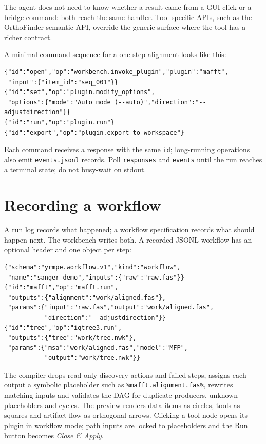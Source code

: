 \documentclass[10pt]{report}
\begin{document}
The agent does not need to know whether a result came from a GUI click or a
bridge command: both reach the same handler. Tool-specific APIs, such as the
OrthoFinder semantic API, override the generic surface where the tool has a
richer contract.

A minimal command sequence for a one-step alignment looks like this:

\begin{lstlisting}[basicstyle=\ttfamily\small,frame=single]
{"id":"open","op":"workbench.invoke_plugin","plugin":"mafft",
 "input":{"item_id":"seq_001"}}
{"id":"set","op":"plugin.modify_options",
 "options":{"mode":"Auto mode (--auto)","direction":"--adjustdirection"}}
{"id":"run","op":"plugin.run"}
{"id":"export","op":"plugin.export_to_workspace"}
\end{lstlisting}

Each command receives a response with the same \texttt{id}; long-running
operations also emit \texttt{events.jsonl} records. Poll \texttt{responses} and
\texttt{events} until the run reaches a terminal state; do not busy-wait on
stdout.

\section{Recording a workflow}

A run log records what happened; a workflow specification records what should
happen next. The workbench writes both. A recorded JSONL workflow has an
optional header and one object per step:

\begin{lstlisting}[basicstyle=\ttfamily\small,frame=single]
{"schema":"yrmpe.workflow.v1","kind":"workflow",
 "name":"sanger-demo","inputs":{"raw":"raw.fas"}}
{"id":"mafft","op":"mafft.run",
 "outputs":{"alignment":"work/aligned.fas"},
 "params":{"input":"raw.fas","output":"work/aligned.fas",
           "direction":"--adjustdirection"}}
{"id":"tree","op":"iqtree3.run",
 "outputs":{"tree":"work/tree.nwk"},
 "params":{"msa":"work/aligned.fas","model":"MFP",
           "output":"work/tree.nwk"}}
\end{lstlisting}

The compiler drops read-only discovery actions and failed steps, assigns each
output a symbolic placeholder such as \texttt{\%mafft.alignment.fas\%},
rewrites matching inputs and validates the DAG for duplicate producers,
unknown placeholders and cycles. The preview renders data items as circles,
tools as squares and artifact flow as orthogonal arrows. Clicking a tool node
opens its plugin in workflow mode; path inputs are locked to placeholders and
the Run button becomes \emph{Close \& Apply}.
\end{document}
